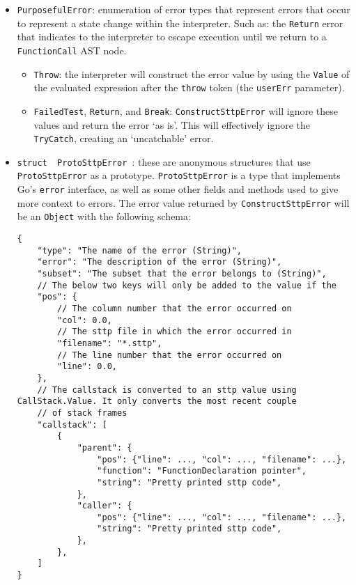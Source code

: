 \begin{itemize}
    \item \verb|PurposefulError|: enumeration of error types that represent errors that occur to represent a state change within the interpreter. Such as: the \verb|Return| error that indicates to the interpreter to escape execution until we return to a \verb|FunctionCall| AST node.
    \begin{itemize}
        \item \verb|Throw|: the interpreter will construct the error value by using the \verb|Value| of the evaluated expression after the \verb|throw| token (the \verb|userErr| parameter).
        \item \verb|FailedTest|, \verb|Return|, and \verb|Break|: \verb|ConstructSttpError| will ignore these values and return the error `as is'. This will effectively ignore the \verb|TryCatch|, creating an `uncatchable' error.
    \end{itemize}
    \item \texttt{struct { ProtoSttpError }}: these are anonymous structures that use \verb|ProtoSttpError| as a prototype. \verb|ProtoSttpError| is a type that implements Go's \texttt{error} interface, as well as some other fields and methods used to give more context to errors. The error value returned by \verb|ConstructSttpError| will be an \verb|Object| with the following schema:
    \begin{verbatim}
{
    "type": "The name of the error (String)",
    "error": "The description of the error (String)",
    "subset": "The subset that the error belongs to (String)",
    // The below two keys will only be added to the value if the 
    "pos": {
        // The column number that the error occurred on
        "col": 0.0,
        // The sttp file in which the error occurred in
        "filename": "*.sttp",
        // The line number that the error occurred on
        "line": 0.0,
    },
    // The callstack is converted to an sttp value using CallStack.Value. It only converts the most recent couple 
    // of stack frames
    "callstack": [
        {
            "parent": {
                "pos": {"line": ..., "col": ..., "filename": ...},
                "function": "FunctionDeclaration pointer",
                "string": "Pretty printed sttp code",
            },
            "caller": {
                "pos": {"line": ..., "col": ..., "filename": ...},
                "string": "Pretty printed sttp code",
            },
        },
    ]
}
    \end{verbatim}
\end{itemize}

